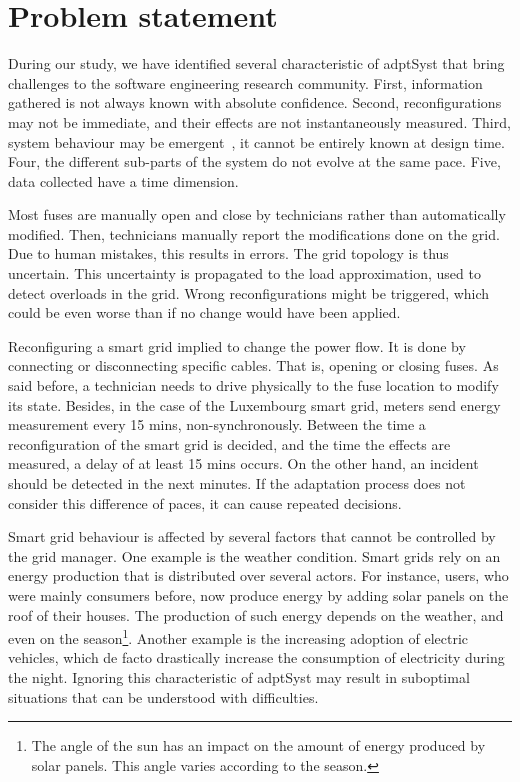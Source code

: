 \section{Problem statement}

During our study, we have identified several characteristic of \gls{adptSyst} that bring challenges to the software engineering research community.
First, information gathered is not always known with absolute confidence.
Second, reconfigurations may not be immediate, and their effects are not instantaneously measured.
Third, system behaviour may be emergent~\cite{zio2011uncertainties}, \ie it cannot be entirely known at design time.
Four, the different sub-parts of the system do not evolve at the same pace.
Five, data collected have a time dimension.

Most fuses are manually open and close by technicians rather than automatically modified.
Then, technicians manually report the modifications done on the grid.
Due to human mistakes, this results in errors.
The grid topology is thus uncertain.
This uncertainty is propagated to the load approximation, used to detect overloads in the grid.
Wrong reconfigurations might be triggered, which could be even worse than if no change would have been applied.

\bigskip

Reconfiguring a smart grid implied to change the power flow.
It is done by connecting or disconnecting specific cables.
That is, opening or closing fuses.
As said before, a technician needs to drive physically to the fuse location to modify its state.
Besides, in the case of the Luxembourg smart grid, meters send energy measurement every 15 mins, non-synchronously.
Between the time a reconfiguration of the smart grid is decided, and the time the effects are measured, a delay of at least 15 mins occurs.
On the other hand, an incident should be detected in the next minutes.
If the adaptation process does not consider this difference of paces, it can cause repeated decisions.

\bigskip

Smart grid behaviour is affected by several factors that cannot be controlled by the grid manager.
One example is the weather condition.
Smart grids rely on an energy production that is distributed over several actors.
For instance, users, who were mainly consumers before, now produce energy by adding solar panels on the roof of their houses.
The production of such energy depends on the weather, and even on the season\footnote{The angle of the sun has an impact on the amount of energy produced by solar panels. This angle varies according to the season.}.
Another example is the increasing adoption of electric vehicles, which de facto drastically increase the consumption of electricity during the night.
Ignoring this characteristic of \gls{adptSyst} may result in suboptimal situations that can be understood with difficulties.






